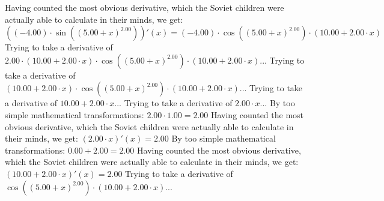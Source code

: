 \documentclass{article}
\begin{document}
 \newline
 \newline 
Having counted the most obvious derivative, which the Soviet children were actually able to calculate in their minds, we get:
$({\left({-4.00}\right) \cdot  \sin {\left({\left({{5.00} + {x}}\right) ^ {2.00}}\right)} })'(x) = {\left({-4.00}\right) \cdot { \cos {\left({\left({{5.00} + {x}}\right) ^ {2.00}}\right)}  \cdot \left({{10.00} + {{2.00} \cdot {x}}}\right)}}$\newline
\newline
Trying to take a derivative of ${{2.00} \cdot {\left({{10.00} + {{2.00} \cdot {x}}}\right) \cdot { \cos {\left({\left({{5.00} + {x}}\right) ^ {2.00}}\right)}  \cdot \left({{10.00} + {{2.00} \cdot {x}}}\right)}}}$...\newline
\newline
Trying to take a derivative of ${\left({{10.00} + {{2.00} \cdot {x}}}\right) \cdot { \cos {\left({\left({{5.00} + {x}}\right) ^ {2.00}}\right)}  \cdot \left({{10.00} + {{2.00} \cdot {x}}}\right)}}$...\newline
\newline
Trying to take a derivative of ${{10.00} + {{2.00} \cdot {x}}}$...\newline
\newline
Trying to take a derivative of ${{2.00} \cdot {x}}$...\newline
\newline
By too simple mathematical transformations:
 ${{2.00} \cdot {1.00}} = {2.00}$ 
 \newline
 \newline 
Having counted the most obvious derivative, which the Soviet children were actually able to calculate in their minds, we get:
$({{2.00} \cdot {x}})'(x) = {2.00}$\newline
\newline
By too simple mathematical transformations:
 ${{0.00} + {2.00}} = {2.00}$ 
 \newline
 \newline 
Having counted the most obvious derivative, which the Soviet children were actually able to calculate in their minds, we get:
$({{10.00} + {{2.00} \cdot {x}}})'(x) = {2.00}$\newline
\newline
Trying to take a derivative of ${ \cos {\left({\left({{5.00} + {x}}\right) ^ {2.00}}\right)}  \cdot \left({{10.00} + {{2.00} \cdot {x}}}\right)}$...\newline
\newline
\end{document}

